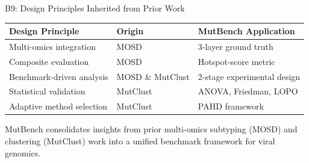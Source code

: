 \documentclass[aspectratio=169,11pt]{beamer}
\begin{document}
\begin{frame}{B9: Design Principles Inherited from Prior Work}

\begin{center}
\begin{tabular}{lll}
\toprule
\textbf{Design Principle} & \textbf{Origin} & \textbf{MutBench Application} \\
\midrule
Multi-omics integration & MOSD & 3-layer ground truth \\
Composite evaluation & MOSD & Hotspot-score metric \\
Benchmark-driven analysis & MOSD \& MutClust & 2-stage experimental design \\
Statistical validation & MutClust & ANOVA, Friedman, LOPO \\
Adaptive method selection & MutClust & PAHD framework \\
\bottomrule
\end{tabular}
\end{center}

\vspace{1em}
MutBench consolidates insights from prior multi-omics subtyping (MOSD) and clustering (MutClust) work into a unified benchmark framework for viral genomics.
\end{frame}
\end{document}
